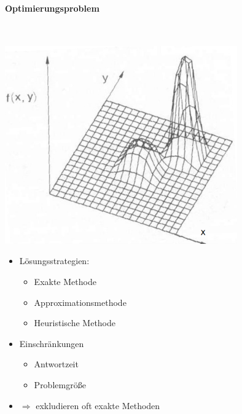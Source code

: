 \documentclass[
    ngerman,
    color=3b,
    dark_mode,
    load_common, %
    summary,
    boxarc,
]{tuda_summary}
\begin{document}
\paragraph{Optimierungsproblem}\mbox{}\\
\begin{minipage}{10cm}
    \includegraphics[width=10cm]{pictures/optimierungsproblem.PNG}
\end{minipage}
\begin{minipage}{\textwidth-10cm-2.22168pt}
    \begin{itemize}
        \item Lösungsstrategien:
              \begin{itemize}
                  \item Exakte Methode
                  \item Approximationsmethode
                  \item Heuristische Methode
              \end{itemize}
        \item Einschränkungen
              \begin{itemize}
                  \item Antwortzeit
                  \item Problemgrö\ss{}e
              \end{itemize}
        \item[] $\Rightarrow$ exkludieren oft exakte Methoden
    \end{itemize}
\end{minipage}
\end{document}
